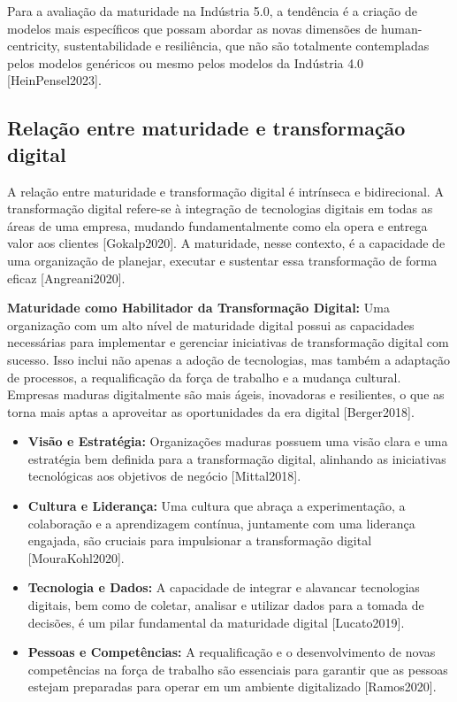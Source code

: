 Para a avaliação da maturidade na Indústria 5.0, a tendência é a criação de modelos mais específicos que possam abordar as novas dimensões de human-centricity, sustentabilidade e resiliência, que não são totalmente contempladas pelos modelos genéricos ou mesmo pelos modelos da Indústria 4.0 [HeinPensel2023].

\subsection{Relação entre maturidade e transformação digital}

A relação entre maturidade e transformação digital é intrínseca e bidirecional. A transformação digital refere-se à integração de tecnologias digitais em todas as áreas de uma empresa, mudando fundamentalmente como ela opera e entrega valor aos clientes [Gokalp2020]. A maturidade, nesse contexto, é a capacidade de uma organização de planejar, executar e sustentar essa transformação de forma eficaz [Angreani2020].

\textbf{Maturidade como Habilitador da Transformação Digital:}
Uma organização com um alto nível de maturidade digital possui as capacidades necessárias para implementar e gerenciar iniciativas de transformação digital com sucesso. Isso inclui não apenas a adoção de tecnologias, mas também a adaptação de processos, a requalificação da força de trabalho e a mudança cultural. Empresas maduras digitalmente são mais ágeis, inovadoras e resilientes, o que as torna mais aptas a aproveitar as oportunidades da era digital [Berger2018].

\begin{itemize}
    \item \textbf{Visão e Estratégia:} Organizações maduras possuem uma visão clara e uma estratégia bem definida para a transformação digital, alinhando as iniciativas tecnológicas aos objetivos de negócio [Mittal2018].
    \item \textbf{Cultura e Liderança:} Uma cultura que abraça a experimentação, a colaboração e a aprendizagem contínua, juntamente com uma liderança engajada, são cruciais para impulsionar a transformação digital [MouraKohl2020].
    \item \textbf{Tecnologia e Dados:} A capacidade de integrar e alavancar tecnologias digitais, bem como de coletar, analisar e utilizar dados para a tomada de decisões, é um pilar fundamental da maturidade digital [Lucato2019].
    \item \textbf{Pessoas e Competências:} A requalificação e o desenvolvimento de novas competências na força de trabalho são essenciais para garantir que as pessoas estejam preparadas para operar em um ambiente digitalizado [Ramos2020].
\end{itemize}

